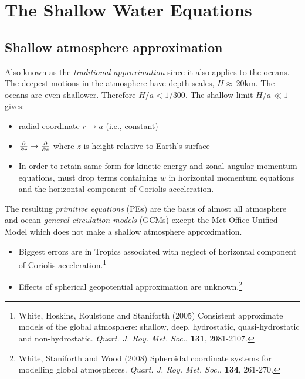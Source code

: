 \newpage
{} %
\chapter{The Shallow Water Equations}

\vspace{1em}

\section{Shallow atmosphere approximation} 

Also known as the {\em traditional approximation} since it also
applies to the oceans. The deepest motions in the atmosphere have
depth scales, $H\approx\,$20km. The oceans are even shallower. Therefore
$H/a< 1/300$. The shallow limit $H/a\ll 1$ gives:

\begin{itemize}
	\item
	radial coordinate $r\rightarrow a$ (i.e., constant)
	
	\item
	$\frac{\partial }{\partial r}\rightarrow \frac{\partial }{\partial z}$ where $z$ is height relative to Earth's surface
	
	\item
	In order to retain same form for kinetic energy and zonal angular
	momentum equations, must drop terms containing $w$ in horizontal
	momentum equations and the horizontal component of Coriolis
	acceleration.
\end{itemize}

The resulting {\em primitive equations} (PEs) are the basis of almost
all atmosphere and ocean {\em general circulation models} (GCMs)
except the Met Office Unified Model which does not make a shallow
atmosphere approximation.

\begin{itemize}
	\item
	Biggest errors are in Tropics associated with neglect of horizontal
	component of Coriolis acceleration.\footnote{\BTi White, Hoskins, Roulstone and Staniforth (2005) Consistent approximate models of the global atmosphere: shallow, deep, hydrostatic, quasi-hydrostatic and non-hydrostatic. \emph{Quart. J. Roy. Met. Soc.}, \textbf{131},
		2081-2107.
		\ETi }
	
	\item
	Effects of spherical geopotential approximation are unknown.\footnote{\BTi White, Staniforth and Wood (2008) Spheroidal coordinate systems for modelling global atmospheres. \emph{Quart. J. Roy. Met. Soc.}, \textbf{134},
		261-270.
		\ETi }
\end{itemize}


